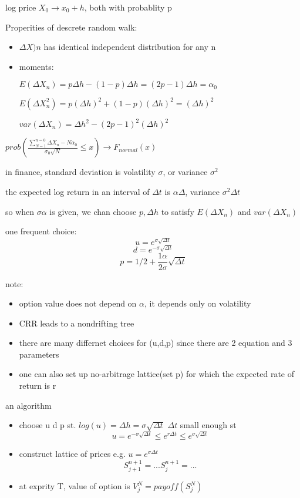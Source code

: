 \documentclass[10pt]{article}
\newcommand{\su}[2]{\sum_{#1}^{#2}}
\theoremstyle{break}
\begin{document}
log price $X_0\rightarrow x_0+h$, both with probablity p

Properities of descrete random walk:
\begin{itemize}
    \item $\Delta X)n$ has identical independent distribution for any n

    \item moments:
    
    $E(\Delta X_n)=p\Delta h-(1-p)\Delta h=(2p-1)\Delta h=\alpha_0$

    $E(\Delta X^2_n)=p(\Delta h)^2+(1-p)(\Delta h)^2 = (\Delta h)^2$

    $var(\Delta X_n)=\Delta h^2-(2p-1)^2(\Delta h)^2$
\end{itemize}

$prob\left(\frac{\su{N-1}{n=0}\Delta X_n-N\alpha_0}{\sigma_0
\sqrt{N}}\leq x\right)\rightarrow F_{normal}(x)$

in finance, standard deviation is volatility $\sigma$, or variance $\sigma^2$

the expected log return in an interval of $\Delta t$ is $\alpha \Delta$, 
variance $\sigma^2 \Delta t$

so when $\sigma \alpha$ is given, we chan choose $p,\Delta h$ to satisfy $E(\Delta X_n)$ and $var(\Delta X_n)$

one frequent choice:
$$u=e^{\sigma\sqrt{\Delta t}}$$
$$d=e^{-\sigma\sqrt{\Delta t}}$$
$$p=1/2+\frac{1\alpha}{2\sigma}\sqrt{\Delta t}$$

note: \begin{itemize}
    \item option value does not depend on $\alpha$, it depends only on volatility 
    \item CRR leads to a nondrifting tree
    \item there are many differnet choices for (u,d,p) since there are 2 equation and 3 parameters 
    \item one can also set up no-arbitrage lattice(set p) for which the expected rate of return is r
 
\end{itemize}

an algorithm
\begin{itemize}
    \item choose u d p st. $log(u)=\Delta h=\sigma\sqrt{\Delta t}$
    $\Delta t$ small enough st $$u=e^{-\sigma\sqrt{\Delta t}}\leq e^{r\Delta t}\leq e^{\sigma\sqrt{\Delta t}}$$
    \item construct lattice of prices e.g. $u=e^{\sigma\Delta t}$
    $$S^{n+1}_{j+1}=... S^{n+1}_{j}=...$$
    \item at exprity T, value of option is $V^N_j=payoff(S_j^N)$
\end{itemize}
\end{document}
